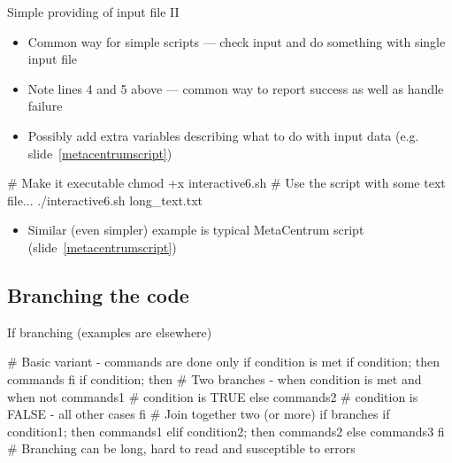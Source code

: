 \documentclass[compress, xelatex, 11pt, xcolor=svgnames, aspectratio=169, url={hyphens, lowtilde}]{beamer}
\begin{document}
\begin{frame}[fragile]{Simple providing of input file II}
	\vfill
	\begin{itemize}
		\item Common way for simple scripts --- check input and do something with single input file
		\item Note lines 4 and 5 above --- common way to report success as well as handle failure
		\item Possibly add extra variables describing what to do with input data (e.g. slide~\ref{metacentrumscript})
	\end{itemize}
	\vfill
	\begin{bashcode}
    # Make it executable
    chmod +x interactive6.sh
    # Use the script with some text file...
    ./interactive6.sh long_text.txt
	\end{bashcode}
	\begin{itemize}
		\item Similar (even simpler) example is typical MetaCentrum script (slide~\ref{metacentrumscript})
\end{itemize}
\end{frame}

\subsection{Branching the code}

\begin{frame}[fragile]{If branching (examples are elsewhere)}
	\begin{bashcode}
    # Basic variant - commands are done only if condition is met
    if condition; then
        commands
      fi
    if condition; then # Two branches - when condition is met and when not
        commands1 # condition is TRUE
      else
        commands2 # condition is FALSE - all other cases
      fi
    # Join together two (or more) if branches
    if condition1; then
        commands1
      elif condition2; then
          commands2
        else
          commands3
        fi # Branching can be long, hard to read and susceptible to errors
	\end{bashcode}
\end{frame}
\end{document}
